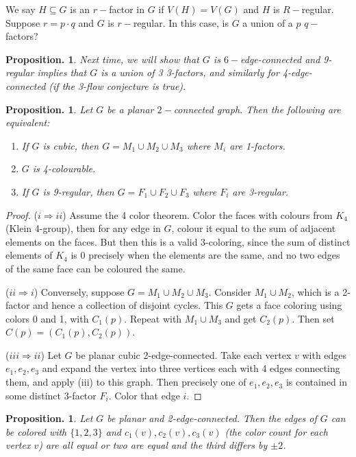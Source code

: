 \documentclass[11pt, a4paper]{memoir}
\newcommand{\imp}[2]{($#1\Rightarrow#2$)\hspace{0.2cm}}
\theoremstyle{change}
\newtheorem{proposition}[theorem]{Proposition.}
\theoremstyle{plain}
\theoremstyle{nonumberplain}
\newtheorem{proof}{Proof}
\numberwithin{equation}{section}
\begin{document}
We say $H\subseteq G$ is an $r-$factor in $G$ if $V(H)=V(G)$ and $H$ is $R-$regular.
Suppose $r=p\cdot q$ and $G$ is $r-$regular.
In this case, is $G$ a union of a $p$ $q-$factors?

\begin{proposition}
    Next time, we will show that $G$ is $6-$edge-connected and 9-regular implies that $G$ is a union of 3 3-factors, and similarly for 4-edge-connected (if the 3-flow conjecture is true).
\end{proposition}
\begin{proposition}
    Let $G$ be a planar $2-$connected graph.
    Then the following are equivalent:
    \begin{enumerate}[nl,r]
        \item If $G$ is cubic, then $G=M_1\cup M_2\cup M_3$ where $M_i$ are 1-factors.
        \item $G$ is 4-colourable.
        \item If $G$ is 9-regular, then $G=F_1\cup F_2\cup F_3$ where $F_i$ are 3-regular.
    \end{enumerate}
\end{proposition}
\begin{proof}
    \imp{i}{ii}
    Assume the 4 color theorem.
    Color the faces with colours from $K_4$ (Klein 4-group), then for any edge in $G$, colour it equal to the sum of adjacent elements on the faces.
    But then this is a valid 3-coloring, since the sum of distinct elements of $K_4$ is 0 precisely when the elements are the same, and no two edges of the same face can be coloured the same.

    \imp{ii}{i}
    Conversely, suppose $G=M_1\cup M_2\cup M_3$.
    Consider $M_1\cup M_2$, which is a 2-factor and hence a collection of disjoint cycles.
    This $G$ gets a face coloring using colors 0 and 1, with $C_1(p)$.
    Repeat with $M_1\cup M_3$ and get $C_2(p)$.
    Then set $C(p)=(C_1(p),C_2(p))$.

    \imp{iii}{ii}
    Let $G$ be planar cubic 2-edge-connected.
    Take each vertex $v$ with edges $e_1,e_2,e_3$ and expand the vertex into three vertices each with 4 edges connecting them, and apply (iii) to this graph.
    Then precisely one of $e_1,e_2,e_3$ is contained in some distinct 3-factor $F_i$.
    Color that edge $i$.
\end{proof}
\begin{proposition}
    Let $G$ be planar and 2-edge-connected.
    Then the edges of $G$ can be colored with $\{1,2,3\}$ and $c_1(v),c_2(v),c_3(v)$ (the color count for each vertex $v$) are all equal or two are equal and the third differs by $\pm 2$.
\end{proposition}
\end{document}
